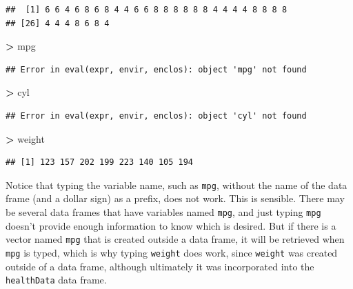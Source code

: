 \documentclass[
]{krantz}
\newenvironment{Shaded}{\begin{snugshade}}{\end{snugshade}}
\newcommand{\NormalTok}[1]{#1}
\newcommand{\OperatorTok}[1]{\textcolor[rgb]{0.81,0.36,0.00}{\textbf{#1}}}
\newcommand{\StringTok}[1]{\textcolor[rgb]{0.31,0.60,0.02}{#1}}
\begin{document}
\begin{Shaded}
\end{Shaded}

\begin{verbatim}
##  [1] 6 6 4 6 8 6 8 4 4 6 6 8 8 8 8 8 8 4 4 4 4 8 8 8 8
## [26] 4 4 4 8 6 8 4
\end{verbatim}

\begin{Shaded}
\begin{Highlighting}[]
\OperatorTok{\textgreater{}}\StringTok{ }\NormalTok{mpg}
\end{Highlighting}
\end{Shaded}

\begin{verbatim}
## Error in eval(expr, envir, enclos): object 'mpg' not found
\end{verbatim}

\begin{Shaded}
\begin{Highlighting}[]
\OperatorTok{\textgreater{}}\StringTok{ }\NormalTok{cyl}
\end{Highlighting}
\end{Shaded}

\begin{verbatim}
## Error in eval(expr, envir, enclos): object 'cyl' not found
\end{verbatim}

\begin{Shaded}
\begin{Highlighting}[]
\OperatorTok{\textgreater{}}\StringTok{ }\NormalTok{weight}
\end{Highlighting}
\end{Shaded}

\begin{verbatim}
## [1] 123 157 202 199 223 140 105 194
\end{verbatim}

Notice that typing the variable name, such as \texttt{mpg}, without the name of the data frame (and a dollar sign) as a prefix, does not work. This is sensible. There may be several data frames that have variables named \texttt{mpg}, and just typing \texttt{mpg} doesn't provide enough information to know which is desired. But if there is a vector named \texttt{mpg} that is created outside a data frame, it will be retrieved when \texttt{mpg} is typed, which is why typing \texttt{weight} does work, since \texttt{weight} was created outside of a data frame, although ultimately it was incorporated into the \texttt{healthData} data frame.
\end{document}
